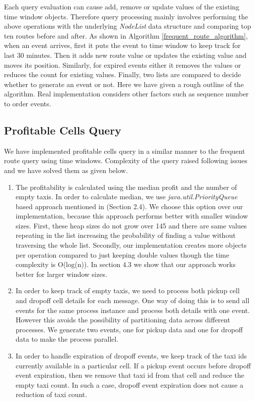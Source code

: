 Each query evaluation can cause add, remove or update values of the existing time window objects. Therefore query processing mainly involves performing the above operations with the underlying \textit{NodeList} data structure and comparing top ten routes before and after. As shown in Algorithm \ref{frequent_route_algorithm}, when an event arrives, first it puts the event to time window to keep track for last 30 minutes. Then it adds new route value or updates the existing value and moves its position. Similarly, for expired events either it removes the values or reduces the count for existing values. Finally, two lists are compared to decide whether to generate an event or not. Here we have given a rough outline of the algorithm. Real implementation considers other factors such as sequence number to order events.

\subsection{Profitable Cells Query}

We have implemented profitable cells query in a similar manner to the frequent route query using  time windows. Complexity of the query raised following issues and we have solved them as given below.
\begin{enumerate}
	\item The profitability is calculated using the median profit and the number of empty taxis. In order to calculate median, we use \textit{java.util.PriorityQueue} based approach mentioned in (Section 2.4). We choose this option over our implementation, because this approach performs better with smaller window sizes. First, these heap sizes do not grow over 145 and there are same values repeating in the list increasing the probability of finding a value without traversing the whole list. Secondly, our implementation creates more objects per operation compared to just keeping double values though the time complexity is O(log(n)). In section 4.3 we show that our approach works better for larger window sizes.
	\item In order to keep track of empty taxis, we need to process both pickup cell and dropoff cell details for each message. One way of doing this is to send all events for the same process instance and process both details with one event. However this avoids the possibility of partitioning data across different processes. We generate two events, one for pickup data and one for dropoff data to make the process parallel. 
	\item In order to handle expiration of dropoff events, we keep track of the taxi ids currently available in a particular cell. If a pickup event occurs before dropoff event expiration, then we remove that taxi id from that cell and reduce the empty taxi count. In such a case, dropoff event expiration does not cause a reduction of taxi count.
\end{enumerate}

